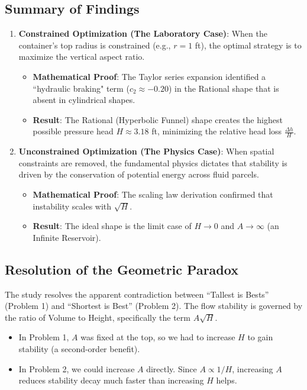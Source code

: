 \documentclass[a4paper, 12pt]{article}
\begin{document}
\subsection{Summary of Findings}
\begin{enumerate}
    \item \textbf{Constrained Optimization (The Laboratory Case)}: 
    When the container's top radius is constrained (e.g., $r=1$ ft), the optimal strategy is to maximize the vertical aspect ratio. 
    \begin{itemize}
        \item \textbf{Mathematical Proof}: The Taylor series expansion identified a ``hydraulic braking" term ($c_2 \approx -0.20$) in the Rational shape that is absent in cylindrical shapes.
        \item \textbf{Result}: The Rational (Hyperbolic Funnel) shape creates the highest possible pressure head $H \approx 3.18$ ft, minimizing the relative head loss $\frac{\Delta h}{H}$.
    \end{itemize}

    \item \textbf{Unconstrained Optimization (The Physics Case)}:
    When spatial constraints are removed, the fundamental physics dictates that stability is driven by the conservation of potential energy across fluid parcels.
    \begin{itemize}
        \item \textbf{Mathematical Proof}: The scaling law derivation confirmed that instability scales with $\sqrt{H}$.
        \item \textbf{Result}: The ideal shape is the limit case of $H \to 0$ and $A \to \infty$ (an Infinite Reservoir).
    \end{itemize}
\end{enumerate}

\subsection{Resolution of the Geometric Paradox}
The study resolves the apparent contradiction between \enquote{Tallest is Bests} (Problem 1) and \enquote{Shortest is Best}  (Problem 2). 
The flow stability is governed by the ratio of Volume to Height, specifically the term $A\sqrt{H}$. 
\begin{itemize}
    \item In Problem 1, $A$ was fixed at the top, so we had to increase $H$ to gain stability (a second-order benefit).
    \item In Problem 2, we could increase $A$ directly. Since $A \propto 1/H$, increasing $A$ reduces stability decay much faster than increasing $H$ helps.
\end{itemize}
\end{document}
